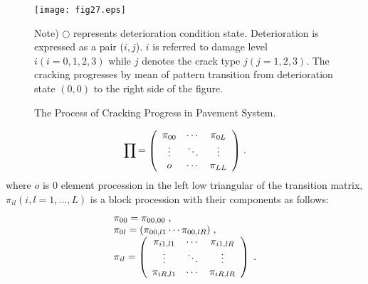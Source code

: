 \begin{figure}[t]
\begin{center}
\texttt{[image: fig27.eps]} 
\end{center}
\footnotesize Note) $\bigcirc$ represents deterioration condition state. Deterioration is expressed as a pair ($i,j$). $i$ is referred to damage level $i(i=0,1,2,3)$ while $j$ denotes the crack type $j(j=1,2,3)$. The cracking progresses by mean of pattern transition from deterioration state $(0,0)$ to the right side of the figure.
\caption{The Process of Cracking Progress in Pavement System.}
\label{fig27} 
\end{figure}
\begin{eqnarray}
\prod { = \left( {\begin{array}{*{20}c}
   {\pi _{00} } &  \cdots  & {\pi _{0L} }  \\
    \vdots  &  \ddots  &  \vdots   \\
   o &  \cdots  & {\pi _{LL} }  \\
\end{array}} \right)} \hspace{1mm}.\label{pi35}
\end{eqnarray}
%
where $o$ is $0$ element procession in the left low triangular of the transition matrix, $\pi_{il}(i,l=1,...,L)$ is a block procession with their components as follows:
\begin{eqnarray}
\begin{array}{l}
 \pi _{00}  = \pi _{00,00} \hspace{1mm}, \\ 
 \pi _{0l}  = (\pi _{00,l1}  \cdots \pi _{00,lR} ) \hspace{1mm},\\ 
 \pi _{il}  = \left( {\begin{array}{*{20}c}
   {\pi _{i1,l1} } &  \cdots  & {\pi _{i1,lR} }  \\
    \vdots  &  \ddots  &  \vdots   \\
   {\pi _{iR,l1} } &  \cdots  & {\pi _{iR,lR} }  \\
\end{array}} \right)\hspace{1mm}. \\ 
 \end{array}
\end{eqnarray}

